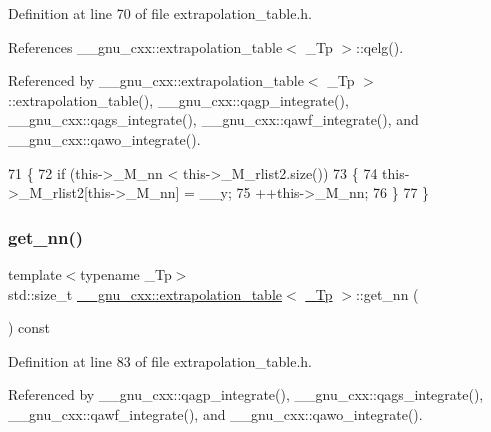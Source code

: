 Definition at line 70 of file extrapolation\+\_\+table.\+h.



References \+\_\+\+\_\+gnu\+\_\+cxx\+::extrapolation\+\_\+table$<$ \+\_\+\+Tp $>$\+::qelg().



Referenced by \+\_\+\+\_\+gnu\+\_\+cxx\+::extrapolation\+\_\+table$<$ \+\_\+\+Tp $>$\+::extrapolation\+\_\+table(), \+\_\+\+\_\+gnu\+\_\+cxx\+::qagp\+\_\+integrate(), \+\_\+\+\_\+gnu\+\_\+cxx\+::qags\+\_\+integrate(), \+\_\+\+\_\+gnu\+\_\+cxx\+::qawf\+\_\+integrate(), and \+\_\+\+\_\+gnu\+\_\+cxx\+::qawo\+\_\+integrate().


\begin{DoxyCode}
71       \{
72         \textcolor{keywordflow}{if} (this->\_M\_nn < this->\_M\_rlist2.size())
73           \{
74             this->\_M\_rlist2[this->\_M\_nn] = \_\_y;
75             ++this->\_M\_nn;
76           \}
77       \}
\end{DoxyCode}
\mbox{\label{class____gnu__cxx_1_1extrapolation__table_a4948ba62ca85ddecc2b530096b368908}} 
\subsubsection{\texorpdfstring{get\+\_\+nn()}{get\_nn()}}
{\footnotesize\ttfamily template$<$typename \+\_\+\+Tp$>$ \\
std\+::size\+\_\+t \hyperlink{class____gnu__cxx_1_1extrapolation__table}{\+\_\+\+\_\+gnu\+\_\+cxx\+::extrapolation\+\_\+table}$<$ \hyperlink{namespace____gnu__cxx_a3b19a9c800ca194374ef9172290f7d79}{\+\_\+\+Tp} $>$\+::get\+\_\+nn (\begin{DoxyParamCaption}{ }\end{DoxyParamCaption}) const\hspace{0.3cm}{\ttfamily [inline]}}



Definition at line 83 of file extrapolation\+\_\+table.\+h.



Referenced by \+\_\+\+\_\+gnu\+\_\+cxx\+::qagp\+\_\+integrate(), \+\_\+\+\_\+gnu\+\_\+cxx\+::qags\+\_\+integrate(), \+\_\+\+\_\+gnu\+\_\+cxx\+::qawf\+\_\+integrate(), and \+\_\+\+\_\+gnu\+\_\+cxx\+::qawo\+\_\+integrate().


